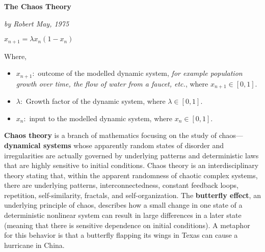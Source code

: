\centerline{\huge \textbf{The Chaos Theory}}
\centerline{\textit{by Robert May, 1975}}

\begin{center}
\centerline{\huge $x_{n+1}=\lambda x_n(1-x_n)$}
\end{center}
Where,
\begin{itemize}
    \item $x_{n+1}:$ outcome of the modelled dynamic system, \textit{for example population growth over time, the flow of water from a faucet, etc.}, where $x_{n+1}\in[0,1]$.
    \item $\lambda:$ Growth factor of the dynamic system, where $\lambda\in [0,1]$.
    \item $x_n:$ input to the modelled dynamic system, where $x_{n}\in[0,1]$.  
\end{itemize}
\textbf{Chaos theory} is a branch of mathematics focusing on the study of chaos—\textbf{dynamical systems} whose apparently random states of disorder and irregularities are actually governed by underlying patterns and deterministic laws that are highly sensitive to initial conditions. Chaos theory is an interdisciplinary theory stating that, within the apparent randomness of chaotic complex systems, there are underlying patterns, interconnectedness, constant feedback loops, repetition, self-similarity, fractals, and self-organization. The \textbf{butterfly effect}, an underlying principle of chaos, describes how a small change in one state of a deterministic nonlinear system can result in large differences in a later state (meaning that there is sensitive dependence on initial conditions). A metaphor for this behavior is that a butterfly flapping its wings in Texas can cause a hurricane in China.
